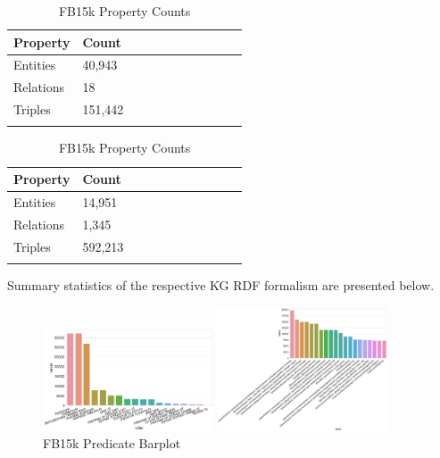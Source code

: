 \begin{table}[H]
	\parbox{.5\linewidth}{
		\centering
		\begin{tabular}{lllllllllll}
  			\textbf{Property} & \textbf{Count}  \\
  			\hline
  			Entities & 40,943  \\
  			Relations & 18  \\
  			Triples & 151,442 \\
			&
		\end{tabular}
		\caption{WN18 Property Counts}
		}
	\hfill
	\parbox{.5\linewidth}{
		\centering
		\begin{tabular}{lllllllllll}
  			\textbf{Property} & \textbf{Count}  \\
  			\hline
  			Entities & 14,951   \\
  			Relations & 1,345  \\
  			Triples & 592,213  \\
			&
		\end{tabular}
		\caption{FB15k Property Counts}
		}
\end{table}


\noindent Summary statistics of the respective KG RDF formalism are presented below.

\begin{figure}[H]
	\parbox{.5\linewidth}{
   		\centering
    		\includegraphics[width=0.45\textwidth, height=0.2\textheight]{WN18_Predicate_Counts}
		\caption{WN18 Predicate Barplot}
		}
	\hfill
	\parbox{.5\linewidth}{
   		\centering
		\includegraphics[width=0.45\textwidth, height=0.2\textheight]{FB15k_Predicate_Counts}
		\caption{FB15k Predicate Barplot}
		}
\end{figure}

